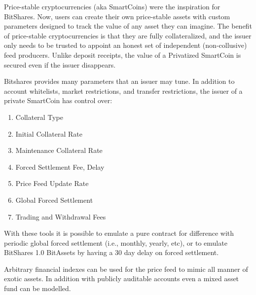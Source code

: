 Price-stable cryptocurrencies (aka SmartCoins) were the inspiration for
BitShares. Now, users can create their own price-stable assets with custom
parameters designed to track the value of any asset they can imagine. The
benefit of price-stable cryptocurrencies is that they are fully collateralized,
and the issuer only needs to be trusted to appoint an honest set of independent
(non-collusive) feed producers. Unlike deposit receipts, the value of a
Privatized SmartCoin is secured even if the issuer disappears.

Bitshares provides many parameters that an issuer may tune. In addition to
account whitelists, market restrictions, and transfer restrictions, the issuer
of a private SmartCoin has control over:

\begin{enumerate}
 \item Collateral Type
 \item Initial Collateral Rate
 \item Maintenance Collateral Rate
 \item Forced Settlement Fee, Delay %
 \item Price Feed Update Rate
 \item Global Forced Settlement
 \item Trading and Withdrawal Fees
\end{enumerate}

With these tools it is possible to emulate a pure contract for difference with
periodic global forced settlement (i.e., monthly, yearly, etc), or to emulate
BitShares 1.0 BitAssets by having a 30 day delay on forced settlement.

Arbitrary financial indexes can be used for the price feed to mimic all manner
of exotic assets. In addition with publicly auditable accounts even a mixed
asset fund can be modelled.
